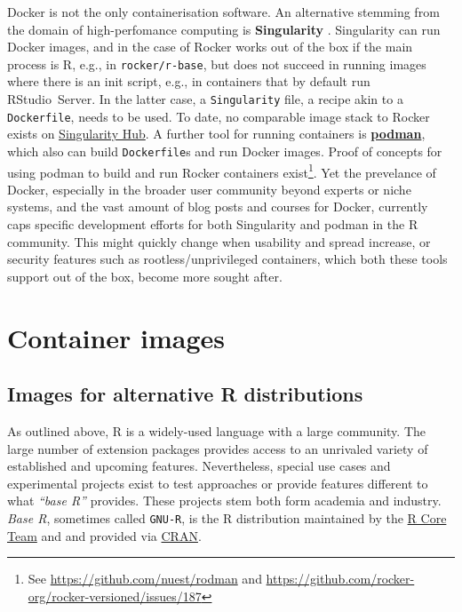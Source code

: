 Docker is not the only containerisation software. An alternative
stemming from the domain of high-perfomance computing is
\textbf{Singularity} \citep{kurtzer_singularity_2017}. Singularity can
run Docker images, and in the case of Rocker works out of the box if the
main process is R, e.g., in \texttt{rocker/r-base}, but does not succeed
in running images where there is an init script, e.g., in containers
that by default run RStudio~Server. In the latter case, a
\texttt{Singularity} file, a recipe akin to a \texttt{Dockerfile}, needs
to be used. To date, no comparable image stack to Rocker exists on
\href{https://singularity-hub.org/}{Singularity Hub}. A further tool for
running containers is
\href{https://github.com/containers/libpod}{\textbf{podman}}, which also
can build \texttt{Dockerfile}s and run Docker images. Proof of concepts
for using podman to build and run Rocker containers
exist\footnote{See \href{https://github.com/nuest/rodman}{https://github.com/nuest/rodman} and \href{https://github.com/rocker-org/rocker-versioned/issues/187}{https://github.com/rocker-org/rocker-versioned/issues/187}}.
Yet the prevelance of Docker, especially in the broader user community
beyond experts or niche systems, and the vast amount of blog posts and
courses for Docker, currently caps specific development efforts for both
Singularity and podman in the R community. This might quickly change
when usability and spread increase, or security features such as
rootless/unprivileged containers, which both these tools support out of
the box, become more sought after.

\hypertarget{container-images}{%
\section{Container images}\label{container-images}}

\label{images}

\hypertarget{images-for-alternative-r-distributions}{%
\subsection{Images for alternative R
distributions}\label{images-for-alternative-r-distributions}}

\label{alternatives}

As outlined above, R is a widely-used language with a large community.
The large number of extension packages provides access to an unrivaled
variety of established and upcoming features. Nevertheless, special use
cases and experimental projects exist to test approaches or provide
features different to what \emph{``base R''} provides. These projects
stem both form academia and industry. \emph{Base R}, sometimes called
\texttt{GNU-R}, is the R distribution maintained by the
\href{https://www.r-project.org/contributors.html}{R Core Team} and and
provided via \href{https://cran.r-project.org/}{CRAN}.


